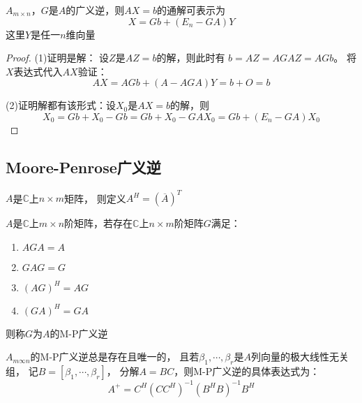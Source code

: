\begin{theorem}[非方阵线性方程组解的表达式]
  $A_{m \times n}$，$G$是$A$的广义逆，则$AX = b$的通解可表示为
  \begin{equation*}
    X = Gb + (E_n - GA)Y
  \end{equation*}
  这里$Y$是任一$n$维向量
\end{theorem}

\begin{proof}
  (1)证明是解：
  设$Z$是$AZ = b$的解，则此时有
  $b = AZ = AGAZ = AGb$。
  将$X$表达式代入$AX$验证：
  \begin{equation*}
    AX = AGb + (A - AGA)Y = b + O = b
  \end{equation*}

  (2)证明解都有该形式：设$X_0$是$AX = b$的解，则
  \begin{equation*}
    X_0 = Gb + X_0 - Gb = Gb + X_0 - GAX_0 = Gb + (E_n - GA)X_0 
  \end{equation*}
\end{proof}

\subsection{Moore-Penrose广义逆}

\begin{definition}[共轭转置]
  $A$是$\mathbb{C}$上$n \times m$矩阵，
  则定义$A^H = (\overline{A})^T$
\end{definition}

\begin{definition}
  $A$是$\mathbb{C}$上$m \times n$阶矩阵，若存在$\mathbb{C}$上$n \times m$阶矩阵$G$满足：
  \begin{enumerate}
  \item $AGA = A$
  \item $GAG = G$
  \item $(AG)^H = AG$
  \item $(GA)^H = GA$
  \end{enumerate}
  则称$G$为$A$的M-P广义逆
\end{definition}

\begin{theorem}[M-P广义逆的存在唯一性]
  $A_{m \infty n}$的M-P广义逆总是存在且唯一的，
  且若$\beta_1,\cdots,\beta_r$是$A$列向量的极大线性无关组，
  记$B = [\beta_1,\cdots,\beta_r]$，
  分解$A = BC$，则M-P广义逆的具体表达式为：
  \begin{equation*}
    A^+ = C^H(CC^H)^{-1}(B^HB)^{-1}B^H
  \end{equation*}
\end{theorem}

